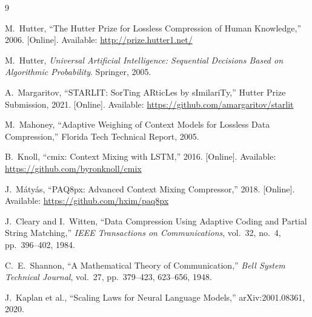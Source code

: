 \documentclass[conference]{IEEEtran}
\begin{document}
\begin{thebibliography}{9}

M.~Hutter, ``The Hutter Prize for Lossless Compression of Human Knowledge,'' 2006. [Online]. Available: \url{http://prize.hutter1.net/}

M.~Hutter, \textit{Universal Artificial Intelligence: Sequential Decisions Based on Algorithmic Probability}. Springer, 2005.

A.~Margaritov, ``STARLIT: SorTing ARticLes by sImilariTy,'' Hutter Prize Submission, 2021. [Online]. Available: \url{https://github.com/amargaritov/starlit}

M.~Mahoney, ``Adaptive Weighing of Context Models for Lossless Data Compression,'' Florida Tech Technical Report, 2005.

B.~Knoll, ``cmix: Context Mixing with LSTM,'' 2016. [Online]. Available: \url{https://github.com/byronknoll/cmix}

J.~Mátyás, ``PAQ8px: Advanced Context Mixing Compressor,'' 2018. [Online]. Available: \url{https://github.com/hxim/paq8px}

J.~Cleary and I.~Witten, ``Data Compression Using Adaptive Coding and Partial String Matching,'' \textit{IEEE Transactions on Communications}, vol.~32, no.~4, pp.~396--402, 1984.

C.~E.~Shannon, ``A Mathematical Theory of Communication,'' \textit{Bell System Technical Journal}, vol.~27, pp.~379--423, 623--656, 1948.

J.~Kaplan et al., ``Scaling Laws for Neural Language Models,'' arXiv:2001.08361, 2020.

\end{thebibliography}
\end{document}
